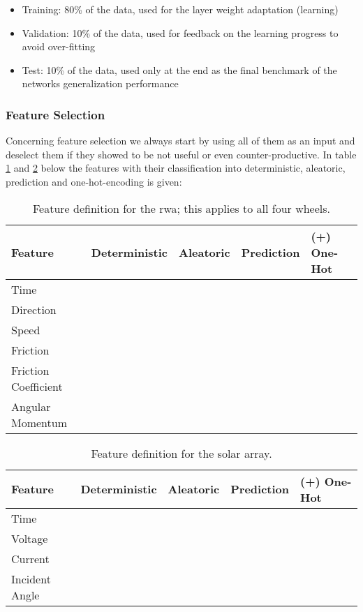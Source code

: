 		\begin{itemize}
		\item Training: 80\% of the data, used for the layer weight adaptation (learning)
		\item Validation: 10\% of the data, used for feedback on the learning progress to avoid over-fitting
		\item Test: 10\% of the data, used only at the end as the final benchmark of the networks generalization performance
		\end{itemize}
		
		\subsubsection{Feature Selection}
		Concerning feature selection we always start by using all of them as an input and deselect them if they showed to be not useful or even counter-productive. In table \ref{t:feature_wheel} and \ref{t:feature_solar} below the features with their classification into deterministic, aleatoric, prediction and one-hot-encoding is given:
		
		\begin{table}[htb]
		\centering
		\caption{Feature definition for the \ac{rwa}; this applies to all four wheels.}
		\begin{tabular}{b{}b{}b{}b{}b{}}
		\toprule
		Feature		& Deterministic	& Aleatoric	& Prediction	& (+) One-Hot	\\ \midrule
		Time			& \checkmark		&			&			&				\\
		Direction	& \checkmark		&			&			&				\\
		Speed		& \checkmark		&			&			& \checkmark		\\
		Friction		& 				&			& \checkmark	&				\\
		Friction Coefficient	& 		& \checkmark	&			&				\\
		Angular Momentum		&		& \checkmark	&			&				\\ \bottomrule
		\end{tabular}
		\label{t:feature_wheel}
		\end{table}
		
		\begin{table}[htb]
		\centering
		\caption{Feature definition for the solar array.}
		\begin{tabular}{b{}b{}b{}b{}b{}}
		\toprule
		Feature		& Deterministic	& Aleatoric	& Prediction	& (+) One-Hot	\\ \midrule
		Time			& \checkmark		&			&			&				\\
		Voltage		& 				&			& \checkmark	& 				\\
		Current		&				& \checkmark	& 			&				\\
		Incident Angle	& \checkmark	&			&			& 				\\ \bottomrule
		\end{tabular}
		\label{t:feature_solar}
		\end{table}
		
